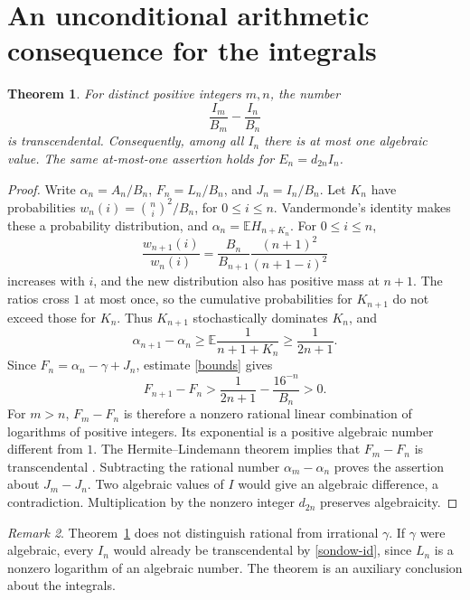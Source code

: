 \documentclass[11pt,a4paper]{article}
\newtheorem{theorem}{Theorem}[section]
\theoremstyle{remark}\newtheorem{remark}[theorem]{Remark}
\begin{document}
\section{An unconditional arithmetic consequence for the integrals}
\begin{theorem}\label{pair-trans}
For distinct positive integers $m,n$, the number
\[
 \frac{I_m}{B_m}-\frac{I_n}{B_n}
\]
is transcendental. Consequently, among all $I_n$ there is at most one
algebraic value. The same at-most-one assertion holds for $E_n=d_{2n}I_n$.
\end{theorem}
\begin{proof}
Write $\alpha_n=A_n/B_n$, $F_n=L_n/B_n$, and $J_n=I_n/B_n$.
Let $K_n$ have probabilities $w_n(i)=\binom ni^2/B_n$, for $0\le i\le n$.
Vandermonde's identity makes these a probability distribution, and
$\alpha_n=\mathbb E H_{n+K_n}$.
For $0\le i\le n$,
\[
 \frac{w_{n+1}(i)}{w_n(i)}
  =\frac{B_n}{B_{n+1}}\frac{(n+1)^2}{(n+1-i)^2}
\]
increases with $i$, and the new distribution also has positive mass at $n+1$.
The ratios cross $1$ at most once, so the cumulative probabilities for
$K_{n+1}$ do not exceed those for $K_n$. Thus $K_{n+1}$ stochastically
dominates $K_n$, and
\[
 \alpha_{n+1}-\alpha_n
 \ge\mathbb E\frac1{n+1+K_n}\ge\frac1{2n+1}.
\]
Since $F_n=\alpha_n-\gamma+J_n$, estimate \eqref{bounds} gives
\[
 F_{n+1}-F_n>
 \frac1{2n+1}-\frac{16^{-n}}{B_n}>0.
\]
For $m>n$, $F_m-F_n$ is therefore a nonzero rational linear combination
of logarithms of positive integers. Its exponential is a positive algebraic
number different from $1$. The Hermite--Lindemann theorem implies that
$F_m-F_n$ is transcendental \cite{baker}. Subtracting the rational number
$\alpha_m-\alpha_n$ proves the assertion about $J_m-J_n$.
Two algebraic values of $I$ would give an algebraic difference, a contradiction.
Multiplication by the nonzero integer $d_{2n}$ preserves algebraicity.
\end{proof}

\begin{remark}
Theorem~\ref{pair-trans} does not distinguish rational from irrational
$\gamma$. If $\gamma$ were algebraic, every $I_n$ would already be
transcendental by \eqref{sondow-id}, since $L_n$ is a nonzero logarithm of an
algebraic number. The theorem is an auxiliary conclusion about the integrals.
\end{remark}
\end{document}
